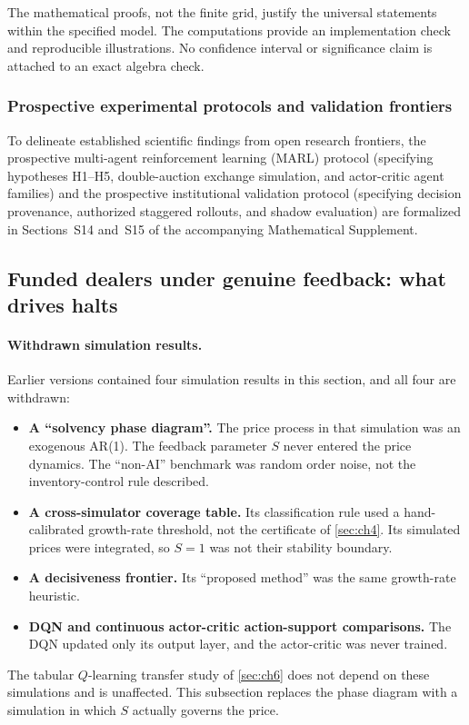 \documentclass[10pt,twocolumn,letterpaper]{article}
\theoremstyle{definition}
\theoremstyle{remark}
\begin{document}
The mathematical proofs, not the finite grid, justify the universal statements within the specified model. The computations provide an implementation check and reproducible illustrations. No confidence interval or significance claim is attached to an exact algebra check.

\subsubsection{Prospective experimental protocols and validation frontiers}
\label{sec:experiments}
\label{sec:empirical}
To delineate established scientific findings from open research frontiers, the prospective multi-agent reinforcement learning (MARL) protocol (specifying hypotheses H1--H5, double-auction exchange simulation, and actor-critic agent families) and the prospective institutional validation protocol (specifying decision provenance, authorized staggered rollouts, and shadow evaluation) are formalized in Sections~S14 and~S15 of the accompanying Mathematical Supplement.

\subsection{Funded dealers under genuine feedback: what drives halts}
\label{sec:solvency_phase_diagram}\label{sec:cross_sim_validation}\label{sec:decisiveness_frontier}

\paragraph{Withdrawn simulation results.} Earlier versions contained four simulation results in this section, and all four are withdrawn:
\begin{itemize}
 \item \textbf{A ``solvency phase diagram''.} The price process in that simulation was an exogenous AR(1). The feedback parameter $S$ never entered the price dynamics. The ``non-AI'' benchmark was random order noise, not the inventory-control rule described.
 \item \textbf{A cross-simulator coverage table.} Its classification rule used a hand-calibrated growth-rate threshold, not the certificate of \cref{sec:ch4}. Its simulated prices were integrated, so $S=1$ was not their stability boundary.
 \item \textbf{A decisiveness frontier.} Its ``proposed method'' was the same growth-rate heuristic.
 \item \textbf{DQN and continuous actor-critic action-support comparisons.} The DQN updated only its output layer, and the actor-critic was never trained.
\end{itemize}
The tabular $Q$-learning transfer study of \cref{sec:ch6} does not depend on these simulations and is unaffected. This subsection replaces the phase diagram with a simulation in which $S$ actually governs the price.
\end{document}
